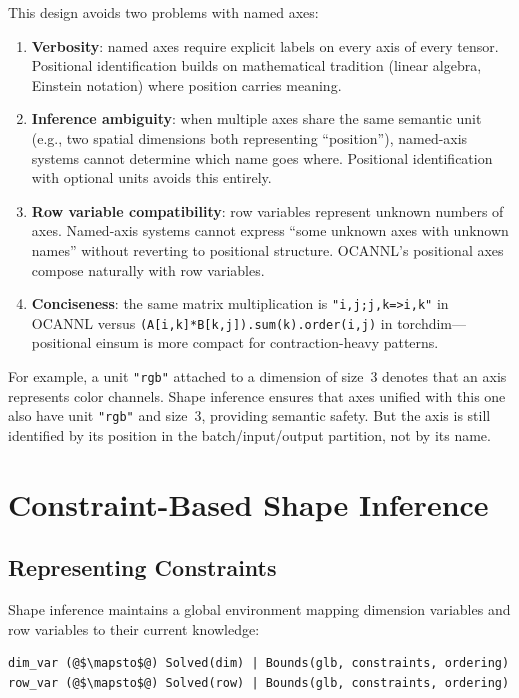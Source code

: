 \documentclass[acmsmall,nonacm,review]{acmart}
\newcommand{\spec}[1]{\texttt{\small #1}}
\begin{document}
This design avoids two problems with named axes:
\begin{enumerate}
\item \textbf{Verbosity}: named axes require explicit labels on every axis of
  every tensor. Positional identification builds on mathematical tradition
  (linear algebra, Einstein notation) where position carries meaning.
\item \textbf{Inference ambiguity}: when multiple axes share the same
  semantic unit (e.g., two spatial dimensions both representing ``position''),
  named-axis systems cannot determine which name goes where. Positional
  identification with optional units avoids this entirely.
\item \textbf{Row variable compatibility}: row variables represent
  unknown numbers of axes. Named-axis systems cannot express ``some
  unknown axes with unknown names'' without reverting to positional
  structure. OCANNL's positional axes compose naturally with row
  variables.
\item \textbf{Conciseness}: the same matrix multiplication is
  \spec{"i,j;j,k=>i,k"} in OCANNL versus
  \texttt{(A[i,k]*B[k,j]).sum(k).order(i,j)} in torchdim---positional
  einsum is more compact for contraction-heavy patterns.
\end{enumerate}

For example, a unit \spec{"rgb"} attached to a dimension of size~3 denotes
that an axis represents color channels. Shape inference ensures that axes
unified with this one also have unit \spec{"rgb"} and size~3, providing
semantic safety. But the axis is still identified by its position in the
batch/input/output partition, not by its name.

\section{Constraint-Based Shape Inference}
\label{sec:inference}

\subsection{Representing Constraints}
\label{sec:constraints}

Shape inference maintains a global environment mapping dimension variables
and row variables to their current knowledge:

\begin{lstlisting}[language={},basicstyle=\small\ttfamily]
dim_var (@$\mapsto$@) Solved(dim) | Bounds(glb, constraints, ordering)
row_var (@$\mapsto$@) Solved(row) | Bounds(glb, constraints, ordering)
\end{lstlisting}
\end{document}
